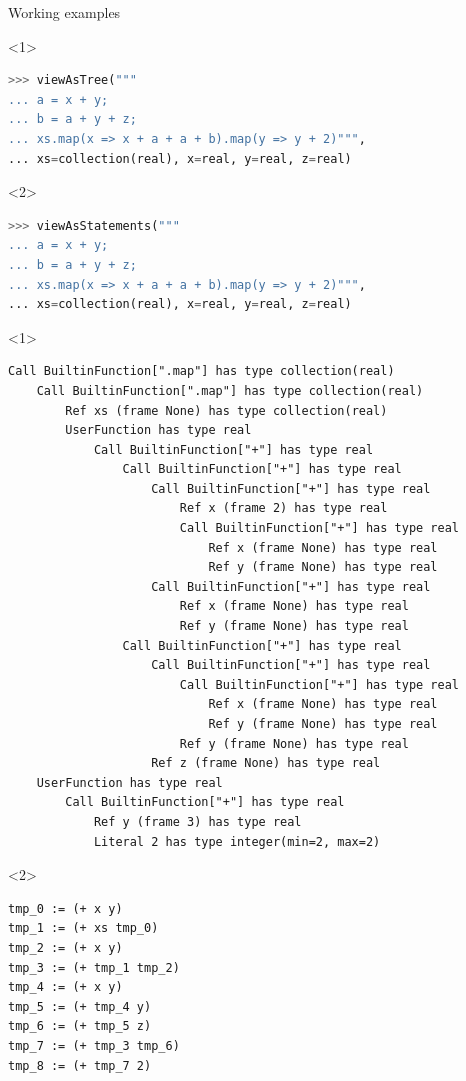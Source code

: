\documentclass{beamer}
\begin{document}
\begin{frame}[fragile]{Working examples}
\begin{onlyenv}<1>
\begin{lstlisting}[language=python]
>>> viewAsTree("""
... a = x + y;
... b = a + y + z;
... xs.map(x => x + a + a + b).map(y => y + 2)""",
... xs=collection(real), x=real, y=real, z=real)
\end{lstlisting}
\end{onlyenv}
\begin{onlyenv}<2>
\begin{lstlisting}[language=python]
>>> viewAsStatements("""
... a = x + y;
... b = a + y + z;
... xs.map(x => x + a + a + b).map(y => y + 2)""",
... xs=collection(real), x=real, y=real, z=real)
\end{lstlisting}
\end{onlyenv}

\vspace{-0.5 cm}
\begin{minipage}[t][12cm][t]{\textwidth}
\begin{onlyenv}<1>
\begin{lstlisting}[basicstyle=\ttfamily\tiny]
Call BuiltinFunction[".map"] has type collection(real)
    Call BuiltinFunction[".map"] has type collection(real)
        Ref xs (frame None) has type collection(real)
        UserFunction has type real
            Call BuiltinFunction["+"] has type real
                Call BuiltinFunction["+"] has type real
                    Call BuiltinFunction["+"] has type real
                        Ref x (frame 2) has type real
                        Call BuiltinFunction["+"] has type real
                            Ref x (frame None) has type real
                            Ref y (frame None) has type real
                    Call BuiltinFunction["+"] has type real
                        Ref x (frame None) has type real
                        Ref y (frame None) has type real
                Call BuiltinFunction["+"] has type real
                    Call BuiltinFunction["+"] has type real
                        Call BuiltinFunction["+"] has type real
                            Ref x (frame None) has type real
                            Ref y (frame None) has type real
                        Ref y (frame None) has type real
                    Ref z (frame None) has type real
    UserFunction has type real
        Call BuiltinFunction["+"] has type real
            Ref y (frame 3) has type real
            Literal 2 has type integer(min=2, max=2)
\end{lstlisting}
\end{onlyenv}
\begin{onlyenv}<2>
\begin{lstlisting}[basicstyle=\ttfamily]
tmp_0 := (+ x y)
tmp_1 := (+ xs tmp_0)
tmp_2 := (+ x y)
tmp_3 := (+ tmp_1 tmp_2)
tmp_4 := (+ x y)
tmp_5 := (+ tmp_4 y)
tmp_6 := (+ tmp_5 z)
tmp_7 := (+ tmp_3 tmp_6)
tmp_8 := (+ tmp_7 2)
\end{lstlisting}
\end{onlyenv}
\end{minipage}
\end{frame}
\end{document}
